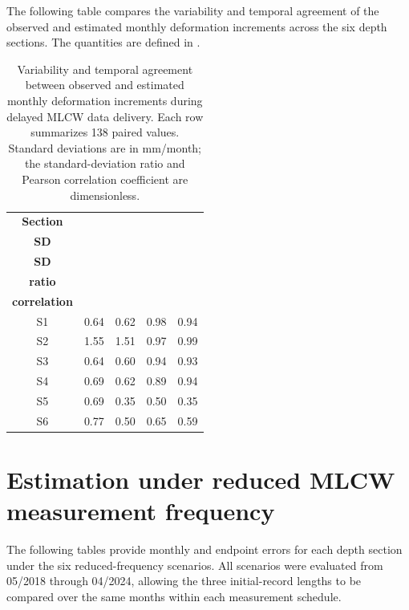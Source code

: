 The following table compares the variability and temporal agreement of the observed and estimated monthly deformation increments across the six depth sections. The quantities are defined in .

\begin{table}[H]
  \centering
  \small
  \setlength{\tabcolsep}{7pt}
  \renewcommand{\arraystretch}{1.15}
  \caption[Variability and temporal agreement by depth section.]{Variability and temporal agreement between observed and estimated monthly deformation increments during delayed MLCW data delivery. Each row summarizes 138 paired values. Standard deviations are in mm/month; the standard-deviation ratio and Pearson correlation coefficient are dimensionless.}
  \label{tab:supp_delayed_variability_diagnostics}
  \begin{tabular}{c|r|r|r|r}
    \toprule
    \textbf{Section} & \shortstack{\textbf{Observed}\\\textbf{SD}} & \shortstack{\textbf{Estimated}\\\textbf{SD}} & \shortstack{\textbf{SD}\\\textbf{ratio}} & \shortstack{\textbf{Temporal}\\\textbf{correlation}} \\
    \midrule
    S1 & 0.64 & 0.62 & 0.98 & 0.94 \\
    S2 & 1.55 & 1.51 & 0.97 & 0.99 \\
    S3 & 0.64 & 0.60 & 0.94 & 0.93 \\
    S4 & 0.69 & 0.62 & 0.89 & 0.94 \\
    S5 & 0.69 & 0.35 & 0.50 & 0.35 \\
    S6 & 0.77 & 0.50 & 0.65 & 0.59 \\
    \bottomrule
  \end{tabular}
\end{table}

\FloatBarrier

\section{Estimation under reduced MLCW measurement frequency}
\label{app:supp_reduced_frequency}

The following tables provide monthly and endpoint errors for each depth section under the six reduced-frequency scenarios. All scenarios were evaluated from 05/2018 through 04/2024, allowing the three initial-record lengths to be compared over the same months within each measurement schedule.

